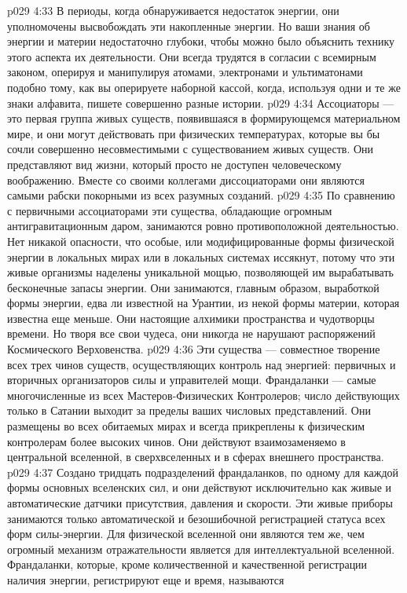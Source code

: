 \vs p029 4:33 В периоды, когда обнаруживается недостаток энергии, они уполномочены высвобождать эти накопленные энергии. Но ваши знания об энергии и материи недостаточно глубоки, чтобы можно было объяснить технику этого аспекта их деятельности. Они всегда трудятся в согласии с всемирным законом, оперируя и манипулируя атомами, электронами и ультиматонами подобно тому, как вы оперируете наборной кассой, когда, используя одни и те же знаки алфавита, пишете совершенно разные истории.
\vs p029 4:34 Ассоциаторы --- это первая группа живых существ, появившаяся в формирующемся материальном мире, и они могут действовать при физических температурах, которые вы бы сочли совершенно несовместимыми с существованием живых существ. Они представляют вид жизни, который просто не доступен человеческому воображению. Вместе со своими коллегами диссоциаторами они являются самыми рабски покорными из всех разумных созданий.
\vs p029 4:35 \bibnobreakspace {} По сравнению с первичными ассоциаторами эти существа, обладающие огромным антигравитационным даром, занимаются ровно противоположной деятельностью. Нет никакой опасности, что особые, или модифицированные формы физической энергии в локальных мирах или в локальных системах иссякнут, потому что эти живые организмы наделены уникальной мощью, позволяющей им вырабатывать бесконечные запасы энергии. Они занимаются, главным образом, выработкой формы энергии, едва ли известной на Урантии, из некой формы материи, которая известна еще меньше. Они настоящие алхимики пространства и чудотворцы времени. Но творя все свои чудеса, они никогда не нарушают распоряжений Космического Верховенства.
\vs p029 4:36 \bibnobreakspace {} Эти существа --- совместное творение всех трех чинов существ, осуществляющих контроль над энергией: первичных и вторичных организаторов силы и управителей мощи. Франдаланки --- самые многочисленные из всех Мастеров\hyp{}Физических Контролеров; число действующих только в Сатании выходит за пределы ваших числовых представлений. Они размещены во всех обитаемых мирах и всегда прикреплены к физическим контролерам более высоких чинов. Они действуют взаимозаменяемо в центральной вселенной, в сверхвселенных и в сферах внешнего пространства.
\vs p029 4:37 Создано тридцать подразделений франдаланков, по одному для каждой формы основных вселенских сил, и они действуют исключительно как живые и автоматические датчики присутствия, давления и скорости. Эти живые приборы занимаются только автоматической и безошибочной регистрацией статуса всех форм силы\hyp{}энергии. Для физической вселенной они являются тем же, чем огромный механизм отражательности является для интеллектуальной вселенной. Франдаланки, которые, кроме количественной и качественной регистрации наличия энергии, регистрируют еще и время, называются 
